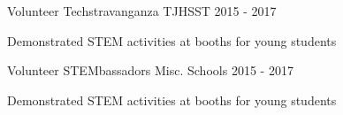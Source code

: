 \begin{cventries}
  \cventry
    {Volunteer}
    {Techstravanganza}
    {TJHSST}
    {2015 - 2017}
    {
      \begin{cvitems}
        \item{Demonstrated STEM activities at booths for young students}
      \end{cvitems}
    }
  \cventry
    {Volunteer}
    {STEMbassadors}
    {Misc. Schools}
    {2015 - 2017}
    {
      \begin{cvitems}
        \item{Demonstrated STEM activities at booths for young students}
      \end{cvitems}
    }
\end{cventries}